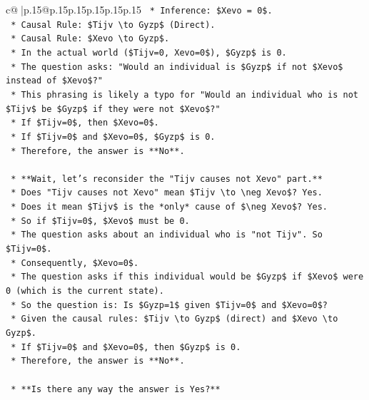 \documentclass{article}
\begin{document}
{\begin{supertabular}{c@{$\;$}|p{.15\linewidth}@{}p{.15\linewidth}p{.15\linewidth}p{.15\linewidth}p{.15\linewidth}p{.15\linewidth}}
{{{\texttt{        *   Inference: \$Xevo = 0\$.} \\
\texttt{        *   Causal Rule: \$Tijv \textbackslash{}to Gyzp\$ (Direct).} \\
\texttt{        *   Causal Rule: \$Xevo \textbackslash{}to Gyzp\$.} \\
\texttt{        *   In the actual world (\$Tijv=0, Xevo=0\$), \$Gyzp\$ is 0.} \\
\texttt{        *   The question asks: "Would an individual is \$Gyzp\$ if not \$Xevo\$ instead of \$Xevo\$?"} \\
\texttt{        *   This phrasing is likely a typo for "Would an individual who is not \$Tijv\$ be \$Gyzp\$ if they were not \$Xevo\$?"} \\
\texttt{        *   If \$Tijv=0\$, then \$Xevo=0\$.} \\
\texttt{        *   If \$Tijv=0\$ and \$Xevo=0\$, \$Gyzp\$ is 0.} \\
\texttt{        *   Therefore, the answer is **No**.} \\
\\ 
\texttt{    *   **Wait, let's reconsider the "Tijv causes not Xevo" part.**} \\
\texttt{        *   Does "Tijv causes not Xevo" mean \$Tijv \textbackslash{}to \textbackslash{}neg Xevo\$? Yes.} \\
\texttt{        *   Does it mean \$Tijv\$ is the *only* cause of \$\textbackslash{}neg Xevo\$? Yes.} \\
\texttt{        *   So if \$Tijv=0\$, \$Xevo\$ must be 0.} \\
\texttt{        *   The question asks about an individual who is "not Tijv". So \$Tijv=0\$.} \\
\texttt{        *   Consequently, \$Xevo=0\$.} \\
\texttt{        *   The question asks if this individual would be \$Gyzp\$ if \$Xevo\$ were 0 (which is the current state).} \\
\texttt{        *   So the question is: Is \$Gyzp=1\$ given \$Tijv=0\$ and \$Xevo=0\$?} \\
\texttt{        *   Given the causal rules: \$Tijv \textbackslash{}to Gyzp\$ (direct) and \$Xevo \textbackslash{}to Gyzp\$.} \\
\texttt{        *   If \$Tijv=0\$ and \$Xevo=0\$, then \$Gyzp\$ is 0.} \\
\texttt{        *   Therefore, the answer is **No**.} \\
\\ 
\texttt{    *   **Is there any way the answer is Yes?**} \\
}}}
\end{supertabular}}
\end{document}
